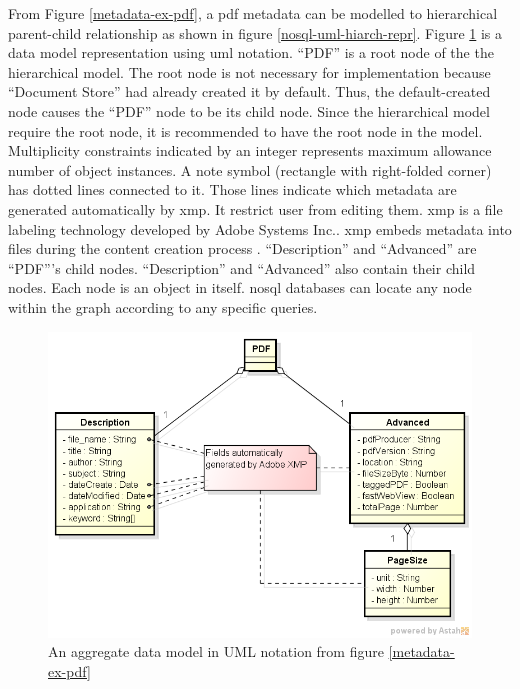 From Figure \ref{metadata-ex-pdf}, a \gls{pdf} metadata can be modelled to hierarchical parent-child relationship as shown in figure \ref{nosql-uml-hiarch-repr}.
Figure \ref{nosql-aggregate-uml} is a data model representation using \gls{uml} notation.
\enquote{PDF} is a root node of the the hierarchical model.
The root node is not necessary for implementation because \enquote{Document Store} had already created it by default.
Thus, the default-created node causes the \enquote{PDF} node to be its child node.
Since the hierarchical model require the root node, it is recommended to have the root node in the model.
Multiplicity constraints indicated by an integer represents maximum allowance number of object instances.
A note symbol (rectangle with right-folded corner) has dotted lines connected to it.
Those lines indicate which metadata are generated automatically by \gls{xmp}.
It restrict user from editing them.
\gls{xmp} is a file labeling technology developed by Adobe Systems Inc..
\gls{xmp} embeds metadata into files during the content creation process \cite{adobe-xml}.
\enquote{Description} and \enquote{Advanced} are \enquote{PDF}'s child nodes.
\enquote{Description} and \enquote{Advanced} also contain their child nodes.
Each node is an object in itself.
\gls{nosql} databases can locate any node within the graph according to any specific queries.
\begin{figure}[ht]
	\centering
	\includegraphics[scale=0.53]{res/bg-knowledge/nosql-nosql-agregate-uml}
	\caption{An aggregate data model in UML notation from figure \ref{metadata-ex-pdf}}
	\label{nosql-aggregate-uml}
\end{figure}

